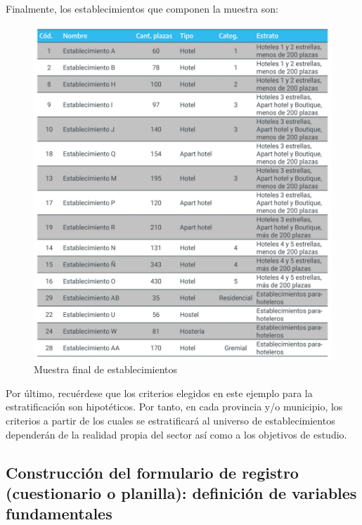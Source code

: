 \documentclass[
]{book}
\begin{document}
Finalmente, los establecimientos que componen la muestra son:

\begin{figure}

{\centering \includegraphics[width=1\linewidth]{imagenes/tabla_4} 

}

\caption{Muestra final de establecimientos}\label{fig:muestra-final}
\end{figure}

Por último, recuérdese que los criterios elegidos en este ejemplo para la estratificación son hipotéticos. Por tanto, en cada provincia y/o municipio, los criterios a partir de los cuales se estratificará al universo de establecimientos dependerán de la realidad propia del sector así como a los objetivos de estudio.

\hypertarget{construcciuxf3n-del-formulario-de-registro-cuestionario-o-planilla-definiciuxf3n-de-variables-fundamentales}{%
\subsection{Construcción del formulario de registro (cuestionario o planilla): definición de variables fundamentales}\label{construcciuxf3n-del-formulario-de-registro-cuestionario-o-planilla-definiciuxf3n-de-variables-fundamentales}}
\end{document}
